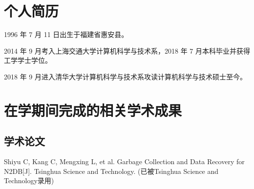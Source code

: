
\begin{resume}

  \section*{个人简历}

  1996 年 7 月 11 日出生于福建省惠安县。

  2014 年 9 月考入上海交通大学计算机科学与技术系，2018 年 7 月本科毕业并获得工学学士学位。

  2018 年 9 月进入清华大学计算机科学与技术系攻读计算机科学与技术硕士至今。


  \section*{在学期间完成的相关学术成果}

  \subsection*{学术论文}

  \begin{achievements}
    \item Shiyu C, Kang C, Mengxing L, et al. Garbage Collection and Data Recovery for N2DB[J]. Tsinghua Science and Technology. (已被Tsinghua Science and Technology录用)
  \end{achievements}




\end{resume}

